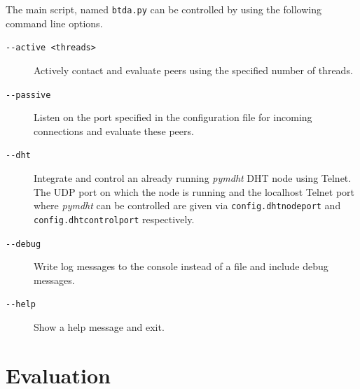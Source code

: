 \documentclass[10pt, a4paper]{scrartcl} %
\renewcommand{\_}{\origunderscore\allowbreak}
\newcommand{\config}[1]{\texttt{config.\allowbreak #1}}
\begin{document}
The main script, named \texttt{btda.py} can be controlled by using the following command line options.

\begin{description}
  \item[\texttt{-{}-active <threads>}] Actively contact and evaluate peers using the specified number of threads.
  \item[\texttt{-{}-passive}] Listen on the port specified in the configuration file for incoming connections and evaluate these peers.
  \item[\texttt{-{}-dht}] Integrate and control an already running \emph{pymdht} \cite{pymdht} DHT node using Telnet. The UDP port on which the node is running and the localhost Telnet port where \emph{pymdht} can be controlled are given via \config{dht\_node\_port} and \config{dht\_control\_port} respectively.
  \item[\texttt{-{}-debug}] Write log messages to the console instead of a file and include debug messages.
  \item[\texttt{-{}-help}] Show a help message and exit.
\end{description}

\section{Evaluation}
\end{document}

